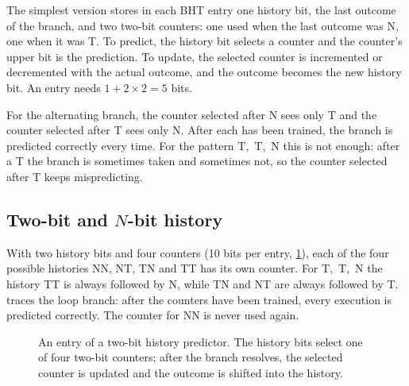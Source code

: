 \documentclass[../main.tex]{subfiles}
\begin{document}
The simplest version stores in each BHT entry one history bit, the last
outcome of the branch, and two two-bit counters: one used when the last
outcome was N, one when it was T.  To predict, the history bit selects a
counter and the counter's upper bit is the prediction.  To update, the
selected counter is incremented or decremented with the actual outcome, and
the outcome becomes the new history bit.  An entry needs $1 + 2\times 2 = 5$
bits.

For the alternating branch, the counter selected after N sees only T and the
counter selected after T sees only N.  After each has been trained, the
branch is predicted correctly every time.  For the pattern T,~T,~N this is not
enough: after a T the branch is sometimes taken and sometimes not, so the
counter selected after T keeps mispredicting.

\subsection{Two-bit and \texorpdfstring{$N$}{N}-bit history}

With two history bits and four counters (10 bits per entry,
\cref{fig:l04-history}), each of the four possible histories NN, NT, TN and
TT has its own counter.  For T,~T,~N the history TT is always followed by N,
while TN and NT are always followed by T.  
traces the loop branch: after the counters have been trained, every
execution is predicted correctly.  The counter for NN is never used again.

\begin{figure}[htbp]
  \centering
  
  \caption{An entry of a two-bit history predictor.  The history bits select
    one of four two-bit counters; after the branch resolves, the selected
    counter is updated and the outcome is shifted into the history.}
  \label{fig:l04-history}
\end{figure}
\end{document}
